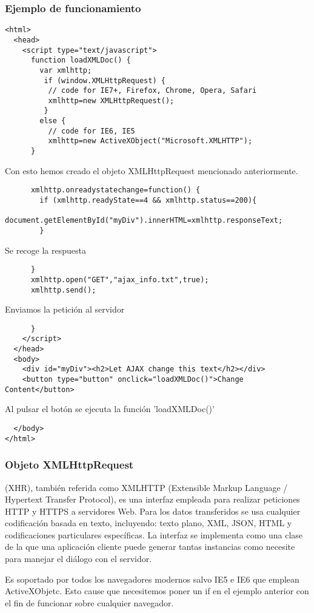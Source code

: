 \documentclass{apuntes}
\begin{document}
\subsubsection{Ejemplo de funcionamiento}
\small
\begin{verbatim}
<html>
  <head>
    <script type="text/javascript">
      function loadXMLDoc() {
        var xmlhttp;
         if (window.XMLHttpRequest) {
          // code for IE7+, Firefox, Chrome, Opera, Safari
          xmlhttp=new XMLHttpRequest();
         }
        else {
          // code for IE6, IE5
          xmlhttp=new ActiveXObject("Microsoft.XMLHTTP");
      }
\end{verbatim}
\normalsize
Con esto hemos creado el objeto XMLHttpRequest mencionado anteriormente.
\small
\begin{verbatim}
      xmlhttp.onreadystatechange=function() {
        if (xmlhttp.readyState==4 && xmlhttp.status==200){
          document.getElementById("myDiv").innerHTML=xmlhttp.responseText;
        }
\end{verbatim}
\normalsize
Se recoge la respuesta
\small
\begin{verbatim}
      }
      xmlhttp.open("GET","ajax_info.txt",true);
      xmlhttp.send();
\end{verbatim}
\normalsize
Enviamos la petición al servidor
\small
\begin{verbatim}
      }
    </script>
  </head>
  <body>
    <div id="myDiv"><h2>Let AJAX change this text</h2></div>
    <button type="button" onclick="loadXMLDoc()">Change Content</button>
\end{verbatim}
\normalsize
Al pulsar el botón se ejecuta la función 'loadXMLDoc()'
\small
\begin{verbatim}
  </body>
</html>
\end{verbatim}

\subsubsection{Objeto XMLHttpRequest}
\begin{defn}
(XHR), también referida como XMLHTTP (Extensible Markup Language / Hypertext Transfer Protocol), es una interfaz empleada para realizar peticiones HTTP y HTTPS a servidores Web. Para los datos transferidos se usa cualquier codificación basada en texto, incluyendo: texto plano, XML, JSON, HTML y codificaciones particulares específicas. La interfaz se implementa como una clase de la que una aplicación cliente puede generar tantas instancias como necesite para manejar el diálogo con el servidor.
\end{defn}
Es soportado por todos los navegadores modernos salvo IE5 e IE6 que emplean ActiveXObjetc. Esto cause que necesitemos poner un if en el ejemplo anterior con el fin de funcionar sobre cualquier navegador.
\end{document}
